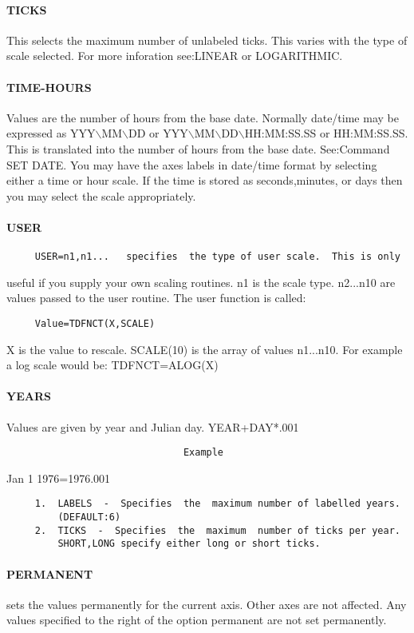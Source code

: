 \paragraph{TICKS     }
This selects the maximum number of unlabeled ticks.  This varies with
the type of  scale  selected.   For  more  inforation  see:LINEAR  or
LOGARITHMIC.  
\paragraph{TIME-HOURS}
Values  are  the  number  of  hours  from  the  base  date.  Normally
date/time may be expressed as YYY$\backslash$MM$\backslash$DD or  YYY$\backslash$MM$\backslash$DD$\backslash$HH:MM:SS.SS  or
HH:MM:SS.SS.   This  is  translated into the number of hours from the
base date.  See:Command SET DATE.  You may have the  axes  labels  in
date/time  format  by  selecting either a time or hour scale.  If the
time is stored as seconds,minutes, or days then you  may  select  the
scale appropriately.  
\paragraph{USER      }
\begin{verbatim}
     USER=n1,n1...   specifies  the type of user scale.  This is only
\end{verbatim}
useful if you supply your own scaling  routines.   n1  is  the  scale
type.   n2...n10  are  values  passed  to the user routine.  The user
function is called:  
\begin{verbatim}
     Value=TDFNCT(X,SCALE) 
\end{verbatim}
X is the value to rescale.  
SCALE(10) is the array of values n1...n10.  
For example a log scale would be:  TDFNCT=ALOG(X) 
\paragraph{YEARS     }
Values are given by year and Julian day.  YEAR+DAY*.001 

\begin{verbatim}
                               Example
\end{verbatim}
Jan 1 1976=1976.001 
\begin{verbatim}
     1.  LABELS  -  Specifies  the  maximum number of labelled years.
         (DEFAULT:6) 
     2.  TICKS  -  Specifies  the  maximum  number of ticks per year.
         SHORT,LONG specify either long or short ticks.  
\end{verbatim}
\paragraph{PERMANENT }
sets the values permanently for the current axis.  Other axes are not
affected.  Any values specified to the right of the option  permanent
are not set permanently.  
